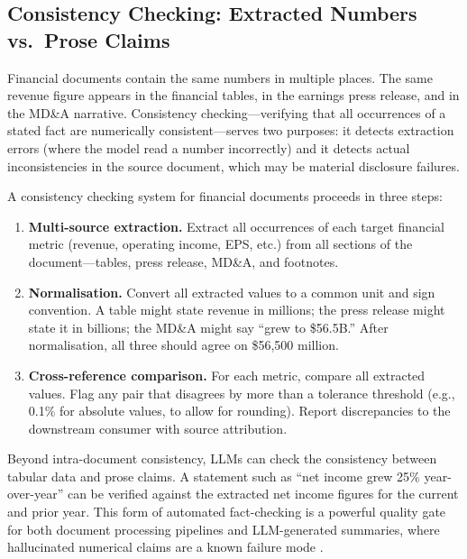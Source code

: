 \subsection{Consistency Checking: Extracted Numbers vs.\ Prose Claims}
\label{sec:ch14-consistency-checking}

Financial documents contain the same numbers in multiple places. The same revenue figure
appears in the financial tables, in the earnings press release, and in the MD\&A
narrative. Consistency checking---verifying that all occurrences of a stated fact are
numerically consistent---serves two purposes: it detects extraction errors (where the
model read a number incorrectly) and it detects actual inconsistencies in the source
document, which may be material disclosure failures.

A consistency checking system for financial documents proceeds in three steps:

\begin{enumerate}
  \item \textbf{Multi-source extraction.} Extract all occurrences of each target
        financial metric (revenue, operating income, EPS, etc.) from all sections of
        the document---tables, press release, MD\&A, and footnotes.
  \item \textbf{Normalisation.} Convert all extracted values to a common unit and sign
        convention. A table might state revenue in millions; the press release might
        state it in billions; the MD\&A might say ``grew to \$56.5B.'' After
        normalisation, all three should agree on \$56,500 million.
  \item \textbf{Cross-reference comparison.} For each metric, compare all extracted
        values. Flag any pair that disagrees by more than a tolerance threshold
        (e.g., 0.1\% for absolute values, to allow for rounding). Report discrepancies
        to the downstream consumer with source attribution.
\end{enumerate}

Beyond intra-document consistency, LLMs can check the consistency between tabular data
and prose claims. A statement such as ``net income grew 25\% year-over-year'' can be
verified against the extracted net income figures for the current and prior year. This
form of automated fact-checking is a powerful quality gate for both document processing
pipelines and LLM-generated summaries, where hallucinated numerical claims are a known
failure mode \citep{maynez2020faithfulness}.

